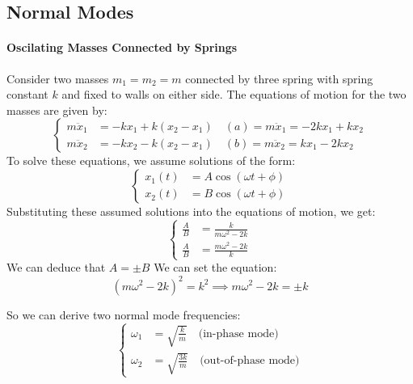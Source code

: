 \documentclass[11pt]{report}
\begin{document}
\subsection{Normal Modes}
\paragraph{Oscilating Masses Connected by Springs} Consider two masses \( m_1 = m_2 = m \) connected by three spring with spring constant \( k \) and fixed to walls on either side. The equations of motion for the two masses are given by:
\begin{equation}
    \begin{cases}
        m\ddot{x}_1 &= -k x_1 + k (x_2 - x_1) \quad (a) = m\ddot{x}_1 = -2k x_1 + k x_2 \\
        m\ddot{x}_2 &= -k x_2 - k (x_2 - x_1) \quad (b) = m\ddot{x}_2 = k x_1 - 2k x_2
    \end{cases}
\end{equation}
To solve these equations, we assume solutions of the form:
$$
    \begin{cases}
        x_1(t) &= A \cos(\omega t + \phi) \\
        x_2(t) &= B \cos(\omega t + \phi)
    \end{cases}
$$
Substituting these assumed solutions into the equations of motion, we get:
\begin{equation} \label{eq:coupled_springs}
    \begin{cases}
        \frac{A}{B} &= \frac{k}{m\omega^2 - 2k} \\
        \frac{A}{B} &= \frac{m\omega^2 - 2k}{k}
    \end{cases}
\end{equation}
We can deduce that $A = \pm B$  
We can set the equation:
$$
    (m\omega^2 - 2k)^2 = k^2 \implies m\omega^2 - 2k = \pm k
$$

So we can derive two normal mode frequencies:
\begin{equation}
    \begin{cases}
        \omega_1 &= \sqrt{\frac{k}{m}} \quad \text{(in-phase mode)} \\
        \omega_2 &= \sqrt{\frac{3k}{m}} \quad \text{(out-of-phase mode)}
    \end{cases}
\end{equation}
\end{document}

